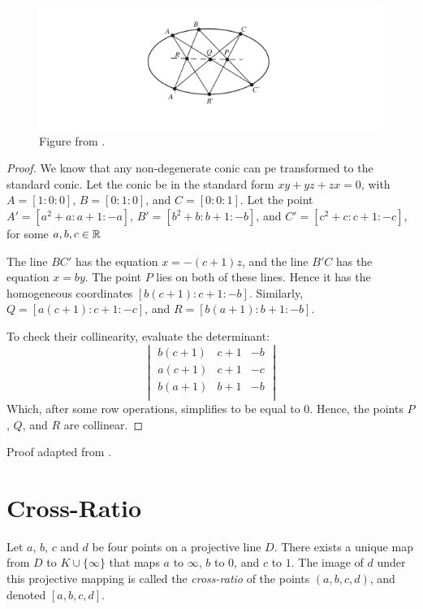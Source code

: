 \begin{figure}[H]
  \center
  \includegraphics[width=\linewidth]{pictures/pascal.png}
  \caption{Figure from \cite{brannan}.}
  \label{fig:pascal}
\end{figure}

\begin{proof}
  We know that any non-degenerate conic can pe transformed to the standard conic. Let the conic
  be in the standard form $xy+yz+zx=0$, with $A=[1:0:0]$, $B=[0:1:0]$, and $C=[0:0:1]$. Let the
  point $A'=[a^2+a:a+1:-a]$, $B'=[b^2+b:b+1:-b]$, and $C'=[c^2+c:c+1:-c]$, for some $a,b,c\in\mathbb{R}$

  The line $BC'$ has the equation $x=-(c+1)z$, and the line $B'C$ has the equation $x=by$. The
  point $P$ lies on both of these lines. Hence it has the homogeneous coordinates
  $[b(c+1):c+1:-b]$. Similarly, $Q=[a(c+1):c+1:-c]$, and $R=[b(a+1):b+1:-b]$.

  To check their collinearity, evaluate the determinant:
  \[
    \begin{vmatrix}
      b(c+1) & c+1 & -b \\
      a(c+1) & c+1 & -c \\
      b(a+1) & b+1 & -b \\
    \end{vmatrix}
  \]
  Which, after some row operations, simplifies to be equal to $0$.
  Hence, the points $P$, $Q$, and $R$ are collinear.
\end{proof}

Proof adapted from \cite{brannan}.

\section{Cross-Ratio}

\begin{definition}
  Let $a$, $b$, $c$ and $d$ be four points on a projective line $D$. There exists a unique map
  from $D$ to $K\cup\{\infty\}$ that maps $a$ to $\infty$, $b$ to $0$, and $c$ to $1$. The
  image of $d$ under this projective mapping is called the \textit{cross-ratio} of the points
  $(a,b,c,d)$, and denoted $[a,b,c,d]$.
\end{definition}

